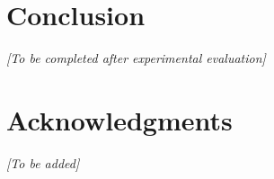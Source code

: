 \documentclass[11pt, a4paper]{article}
\begin{document}
\section{Conclusion}

\textit{[To be completed after experimental evaluation]}



\section*{Acknowledgments}

\textit{[To be added]}



\end{document}
